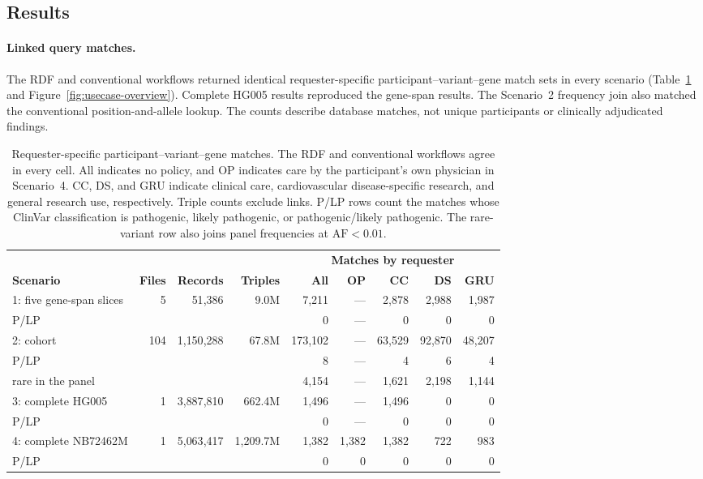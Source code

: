\documentclass[11pt]{article}
\begin{document}
\subsection{Results}\label{subsec:usecase-results}
\paragraph{Linked query matches.}
The RDF and conventional workflows returned identical requester-specific participant--variant--gene match sets in every scenario (Table~\ref{tab:usecase-matches} and Figure~\ref{fig:usecase-overview}).
Complete HG005 results reproduced the gene-span results.
The Scenario~2 frequency join also matched the conventional position-and-allele lookup.
The counts describe database matches, not unique participants or clinically adjudicated findings.

\begin{table}[!htbp]
\caption{Requester-specific participant--variant--gene matches.
The RDF and conventional workflows agree in every cell.
All indicates no policy, and OP indicates care by the participant's own physician in Scenario~4.
CC, DS, and GRU indicate clinical care, cardiovascular disease-specific research, and general research use, respectively.
Triple counts exclude links.
P/LP rows count the matches whose ClinVar classification is pathogenic, likely pathogenic, or pathogenic/likely pathogenic.
The rare-variant row also joins panel frequencies at $\mathrm{AF}<0.01$.}\label{tab:usecase-matches}%
\centering\footnotesize\setlength{\tabcolsep}{6pt}\renewcommand{\arraystretch}{1.1}%
\begin{tabular}{@{}l r r r r r r r r@{}}
\toprule
 & & & & \multicolumn{5}{c}{\textbf{Matches by requester}}\\
\cmidrule(l){5-9}
\textbf{Scenario} & \textbf{Files} & \textbf{Records} & \textbf{Triples} & \textbf{All} & \textbf{OP} & \textbf{CC} & \textbf{DS} & \textbf{GRU}\\
\midrule
1: five gene-span slices & 5 & 51{,}386 & 9.0M & 7{,}211 & --- & 2{,}878 & 2{,}988 & 1{,}987\\
\quad P/LP & & & & 0 & --- & 0 & 0 & 0\\
2: cohort & 104 & 1{,}150{,}288 & 67.8M & 173{,}102 & --- & 63{,}529 & 92{,}870 & 48{,}207\\
\quad P/LP & & & & 8 & --- & 4 & 6 & 4\\
\quad rare in the panel & & & & 4{,}154 & --- & 1{,}621 & 2{,}198 & 1{,}144\\
3: complete HG005 & 1 & 3{,}887{,}810 & 662.4M & 1{,}496 & --- & 1{,}496 & 0 & 0\\
\quad P/LP & & & & 0 & --- & 0 & 0 & 0\\
4: complete NB72462M & 1 & 5{,}063{,}417 & 1{,}209.7M & 1{,}382 & 1{,}382 & 1{,}382 & 722 & 983\\
\quad P/LP & & & & 0 & 0 & 0 & 0 & 0\\
\bottomrule
\end{tabular}
\end{table}
\end{document}
